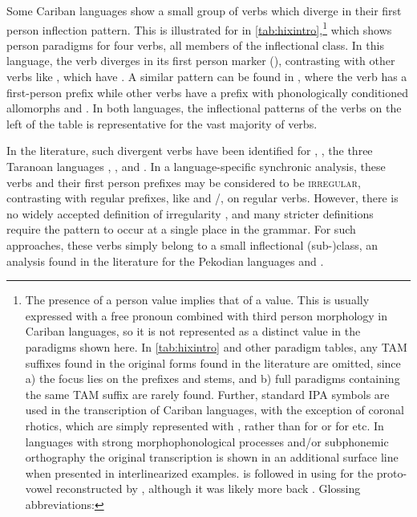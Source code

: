 Some Cariban languages show a small group of verbs which diverge in their first person inflection pattern.
This is illustrated for \hixka in \cref{tab:hixintro},\footnote{The presence of a  person value implies that of a  value.
This is usually expressed with a free pronoun combined with third person morphology in Cariban languages, so it is not represented as a distinct value in the paradigms shown here.
In \cref{tab:hixintro} and other paradigm tables, any TAM suffixes found in the original forms found in the literature are omitted, since a) the focus lies on the prefixes and stems, and b) full paradigms containing the same TAM suffix are rarely found.
Further, standard IPA symbols are used in the transcription of Cariban languages, with the exception of coronal rhotics, which are simply represented with , rather than  for \wayana or  for \maqui etc.
In languages with strong morphophonological processes and/or subphonemic orthography the original transcription is shown in an additional surface line when presented in interlinearized examples.
\textcite{gildea2018reconstructing} is followed in using  for the proto-vowel reconstructed by \textcite{meira2005southern}, although it was likely more back \parencite{gildea2010story}.
Glossing abbreviations: }%
which shows person paradigms for four verbs, all members of the  inflectional class.
In this language, the verb  diverges in its first person marker (), contrasting with other  verbs like , which have .
A similar pattern can be found in \trio, where the verb  has a first-person prefix  while other  verbs have a prefix with phonologically conditioned allomorphs  and  .
In both languages, the inflectional patterns of the verbs on the left of the table is representative for the vast majority of  verbs.

In the literature, such divergent verbs have been identified for \hixka \parencite[188]{hixkaryanaderby1985}, \waiwai \parencite[90]{gildea1998}, the three Taranoan languages \parencite[112--115]{meira1998proto}, \bakairi \parencite{meira2003bakairi}, and \arara \parencite[153]{alves2017arara}.
In a language-specific synchronic analysis, these verbs and their first person prefixes may be considered to be \textsc{irregular}, contrasting with regular prefixes, like \hixka {} and \trio {}/, on regular verbs.
However, there is no widely accepted definition of irregularity \parencite{stolz2012introduction}, and many stricter definitions \parencite[][e.g.]{haspelmath2010understanding} require the pattern to occur at a single place in the grammar.
For such approaches, these verbs simply belong to a small inflectional (sub-)class, an analysis found in the literature for the Pekodian languages \bakairi and \arara \parencites[4]{meira2003bakairi}[149]{alves2017arara}.

